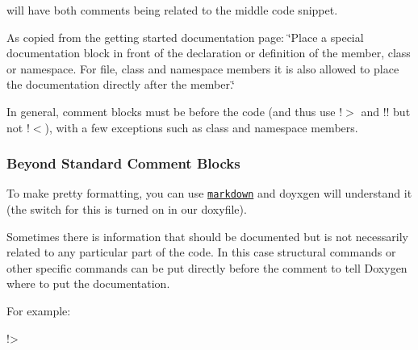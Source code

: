 will have both comments being related to the middle code snippet.

As copied from the \textquotesingle{}getting started\textquotesingle{} documentation page\+: \char`\"{}\+Place a special documentation block in front of the declaration or definition of the member, class or namespace.
\+For file, class and namespace members it is also allowed to place the documentation directly after the member.\char`\"{}

In general, comment blocks must be before the code (and thus use \textquotesingle{}!$>$\textquotesingle{} and \textquotesingle{}!!\textquotesingle{} but not \textquotesingle{}!$<$\textquotesingle{}), with a few exceptions such as class and namespace members.

\subsubsection*{Beyond Standard Comment Blocks}

To make \textquotesingle{}pretty\textquotesingle{} formatting, you can use \href{http://daringfireball.net/projects/markdown/syntax}{\tt markdown} and doyxgen will understand it (the switch for this is turned on in our doxyfile).

Sometimes there is information that should be documented but is not necessarily related to any particular part of the code. In this case structural commands or other specific commands can be put directly before the comment to tell Doxygen where to put the documentation.

For example\+: \begin{DoxyVerb}!>\end{DoxyVerb}
 